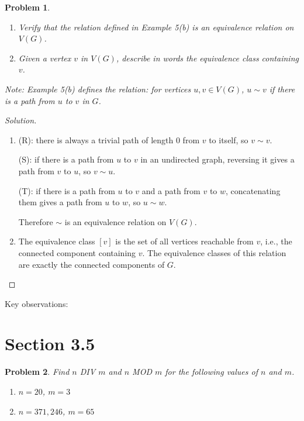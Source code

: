 \documentclass[12pt]{article}
\newtheorem{problem}{Problem}
\begin{document}
\setcounter{problem}{16}
\begin{problem}
\begin{enumerate}[label=(\alph*)]
    \item Verify that the relation defined in Example 5(b) is an equivalence relation on $V(G)$.

    \item Given a vertex $v$ in $V(G)$, describe in words the equivalence class containing $v$.
\end{enumerate}

Note: Example 5(b) defines the relation: for vertices $u, v \in V(G)$, $u \sim v$ if there is a path from $u$ to $v$ in $G$.
\end{problem}

\begin{proof}[Solution]
~
\begin{enumerate}[label=(\alph*)]
    \item (R): there is always a trivial path of length 0 from $v$ to itself, so $v \sim v$.

    (S): if there is a path from $u$ to $v$ in an undirected graph, reversing it gives a path from $v$ to $u$, so $v \sim u$.

    (T): if there is a path from $u$ to $v$ and a path from $v$ to $w$, concatenating them gives a path from $u$ to $w$, so $u \sim w$.

    Therefore $\sim$ is an equivalence relation on $V(G)$.

    \vspace{0.3in}

    \item The equivalence class $[v]$ is the set of all vertices reachable from $v$, i.e., the connected component containing $v$. The equivalence classes of this relation are exactly the connected components of $G$.
\end{enumerate}
\end{proof}



    
    Key observations:

\section*{Section 3.5}

\setcounter{problem}{1}
\begin{problem}
Find $n$ DIV $m$ and $n$ MOD $m$ for the following values of $n$ and $m$.

\begin{enumerate}[label=(\alph*)]
    \item $n = 20$, $m = 3$
    \setcounter{enumi}{4}
    
    \item $n = 371{,}246$, $m = 65$
\end{enumerate}
\end{problem}
\end{document}
